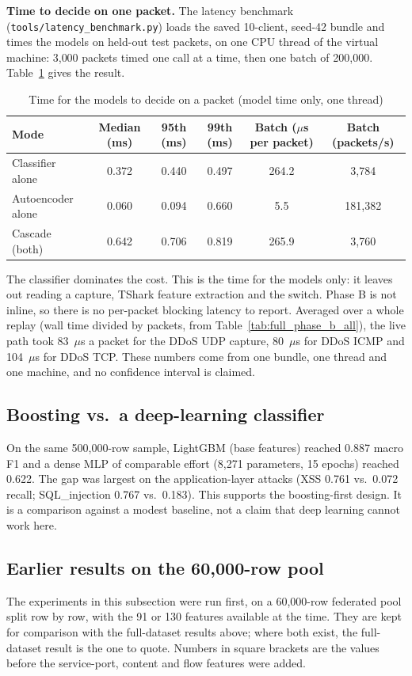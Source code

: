 \textbf{Time to decide on one packet.} The latency benchmark (\texttt{tools/latency\_benchmark.py}) loads the saved 10-client, seed-42 bundle and times the models on held-out test packets, on one CPU thread of the virtual machine: 3{,}000 packets timed one call at a time, then one batch of 200{,}000. Table~\ref{tab:latency} gives the result.
\begin{table}[H]
\centering
\small
\renewcommand{\arraystretch}{1.15}
\begin{tabular}{|l|c|c|c|c|c|}
\hline
\textbf{Mode} & \textbf{Median (ms)} & \textbf{95th (ms)} & \textbf{99th (ms)} & \textbf{Batch ($\mu$s per packet)} & \textbf{Batch (packets/s)} \\ \hline
Classifier alone & 0.372 & 0.440 & 0.497 & 264.2 & 3{,}784 \\ \hline
Autoencoder alone & 0.060 & 0.094 & 0.660 & 5.5 & 181{,}382 \\ \hline
Cascade (both) & 0.642 & 0.706 & 0.819 & 265.9 & 3{,}760 \\ \hline
\end{tabular}
\caption{Time for the models to decide on a packet (model time only, one thread)}
\label{tab:latency}
\end{table}
The classifier dominates the cost. This is the time for the models only: it leaves out reading a capture, TShark feature extraction and the switch. Phase B is not inline, so there is no per-packet blocking latency to report. Averaged over a whole replay (wall time divided by packets, from Table~\ref{tab:full_phase_b_all}), the live path took 83~$\mu$s a packet for the DDoS UDP capture, 80~$\mu$s for DDoS ICMP and 104~$\mu$s for DDoS TCP. These numbers come from one bundle, one thread and one machine, and no confidence interval is claimed.

\subsection{Boosting vs.\ a deep-learning classifier}
On the same 500{,}000-row sample, LightGBM (base features) reached 0.887 macro F1 and a dense MLP of comparable effort (8{,}271 parameters, 15 epochs) reached 0.622. The gap was largest on the application-layer attacks (XSS 0.761 vs.\ 0.072 recall; SQL\_injection 0.767 vs.\ 0.183). This supports the boosting-first design. It is a comparison against a modest baseline, not a claim that deep learning cannot work here.

\subsection{Earlier results on the 60{,}000-row pool}\label{sec:earlier}
The experiments in this subsection were run first, on a 60{,}000-row federated pool split row by row, with the 91 or 130 features available at the time. They are kept for comparison with the full-dataset results above; where both exist, the full-dataset result is the one to quote. Numbers in square brackets are the values before the service-port, content and flow features were added.

